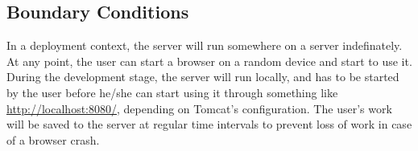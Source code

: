 \documentclass[a4paper]{article}
\begin{document}


\subsection{Boundary Conditions}

In a deployment context, the server will run somewhere on a server indefinately. At any point, the user can start a browser on a random device and start to use it.
During the development stage, the server will run locally, and has to be started by the user before he/she can start using it through something like \url{http://localhost:8080/}, depending on Tomcat's configuration.
The user's work will be saved to the server at regular time intervals to prevent loss of work in case of a browser crash.
\end{document}
